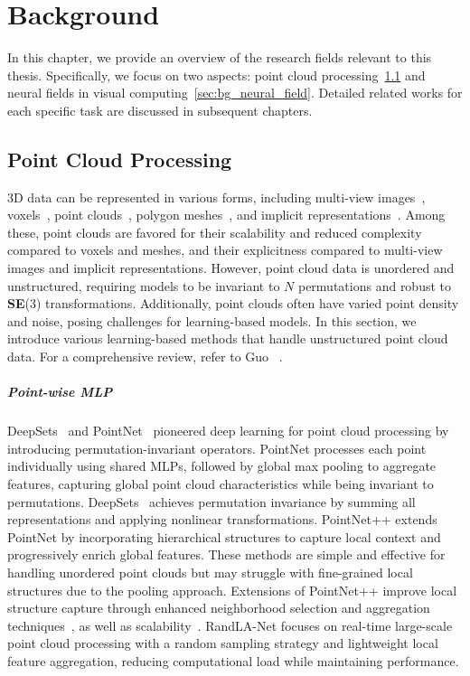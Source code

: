 \chapter{Background}
\label{chap:background}

In this chapter, we provide an overview of the research fields relevant to this thesis. Specifically, we focus on two aspects: point cloud processing~\cref{sec:bg_point_cloud} and neural fields in visual computing~\cref{sec:bg_neural_field}. Detailed related works for each specific task are discussed in subsequent chapters.

\section{Point Cloud Processing}
\label{sec:bg_point_cloud}
3D data can be represented in various forms, including multi-view images~\cite{su2015multi,qi2016volumetric}, voxels~\cite{wu20153d,maturana2015voxnet}, point clouds~\cite{qi2017pointnet,wang2019dynamic}, polygon meshes~\cite{hanocka2019meshcnn,NEURIPS2020_0a656cc1}, and implicit representations~\cite{mescheder2019occupancy,park2019deepsdf,chen2019learning,yang2021geometry}. Among these, point clouds are favored for their scalability and reduced complexity compared to voxels and meshes, and their explicitness compared to multi-view images and implicit representations. However, point cloud data is unordered and unstructured, requiring models to be invariant to $N\!$ permutations and robust to \textbf{SE}(3) transformations. Additionally, point clouds often have varied point density and noise, posing challenges for learning-based models. In this section, we introduce various learning-based methods that handle unstructured point cloud data. For a comprehensive review, refer to Guo \etal~\cite{guo2020deep}.

\paragraph{Point-wise MLP}
DeepSets~\cite{zaheer2017deep} and PointNet~\cite{qi2017pointnet} pioneered deep learning for point cloud processing by introducing permutation-invariant operators. PointNet processes each point individually using shared MLPs, followed by global max pooling to aggregate features, capturing global point cloud characteristics while being invariant to permutations. DeepSets~\cite{zaheer2017deep} achieves permutation invariance by summing all representations and applying nonlinear transformations. PointNet++\cite{qi2017pointnet++} extends PointNet by incorporating hierarchical structures to capture local context and progressively enrich global features. These methods are simple and effective for handling unordered point clouds but may struggle with fine-grained local structures due to the pooling approach. Extensions of PointNet++ improve local structure capture through enhanced neighborhood selection and aggregation techniques~\cite{wang2019dynamic}, as well as scalability~\cite{NEURIPS2022_9318763d}. RandLA-Net\cite{hu2020randla} focuses on real-time large-scale point cloud processing with a random sampling strategy and lightweight local feature aggregation, reducing computational load while maintaining performance.

